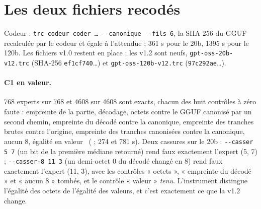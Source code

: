 \section{Les deux fichiers recodés}\label{t3cod:sec:fichiers}

Codeur : \texttt{trc-codeur coder \dots{} -{}-canonique -{}-fils 6}, la SHA-256 du GGUF recalculée par le codeur et égale à l'attendue ; 361 s pour le 20b, \num{1395} s pour le 120b. Les fichiers v1.0 restent en place ; les v1.2 sont neufs, \texttt{gpt-oss-20b-v12.trc} (SHA-256 \texttt{ef1cf740}\dots) et \texttt{gpt-oss-120b-v12.trc} (\texttt{97c292ae}\dots).

\paragraph{C1 en valeur.} 768 experts sur 768 et \num{4608} sur \num{4608} sont exacts, chacun des huit contrôles à zéro faute : empreinte de la partie, décodage, octets contre le GGUF canonisé par un second chemin, empreinte du décodé contre la canonique, empreinte des tranches brutes contre l'origine, empreinte des tranches canonisées contre la canonique, aucun 8, égalité en valeur \mes~( ; 274 et 781 s). Deux cassures sur le 20b : \texttt{-{}-casser 5 7} (un bit de la première médiane retourné) rend faux exactement l'expert (5, 7) ; \texttt{-{}-casser-8 11 3} (un demi-octet 0 du décodé changé en 8) rend faux exactement l'expert (11, 3), avec les contrôles « octets », « empreinte du décodé » et « aucun 8 » tombés, et le contrôle « valeur » \emph{tenu}. L'instrument distingue l'égalité des octets de l'égalité des valeurs, et c'est exactement ce que la v1.2 change.

